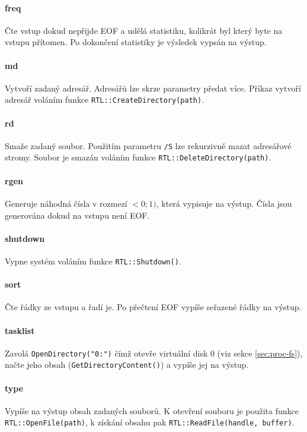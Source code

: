 \documentclass[11pt,a4paper]{scrartcl}
\begin{document}
	
	\paragraph{freq}
	Čte vstup dokud nepřijde EOF a udělá statistiku, kolikrát byl který byte na vstupu přítomen. Po dokončení statistiky je výsledek vypsán na výstup. 
	
	\paragraph{md}
	Vytvoří zadaný adresář. Adresářů lze skrze parametry předat více. Příkaz vytvoří adresář voláním funkce \verb|RTL::CreateDirectory(path)|.
	
	\paragraph{rd}
	Smaže zadaný soubor. Použitím parametru \verb|/S| lze rekurzivně mazat adresářové stromy. Soubor je smazán voláním funkce \verb|RTL::DeleteDirectory(path)|.
	
	\paragraph{rgen}
	Generuje náhodná čísla v rozmezí $<0;1)$, která vypisuje na výstup. Čísla jsou generována dokud na vstupu není EOF.
	
	\paragraph{shutdown}
	Vypne systém voláním funkce \verb|RTL::Shutdown()|.
	
	\paragraph{sort}
	Čte řádky ze vstupu a řadí je. Po přečtení EOF vypíše seřazené řádky na výstup.
	
	\paragraph{tasklist}
	Zavolá \verb|OpenDirectory("0:")| čímž otevře virtuální disk 0 (viz sekce \ref{sec:proc-fs}), načte jeho obsah (\verb|GetDirectoryContent()|) a vypíše jej na výstup.
	
	\paragraph{type}
	Vypíše na výstup obsah zadaných souborů. K otevření souboru je použita funkce \verb|RTL::OpenFile(path)|, k získání obsahu pak \verb|RTL::ReadFile(handle, buffer)|.
	
\end{document}
